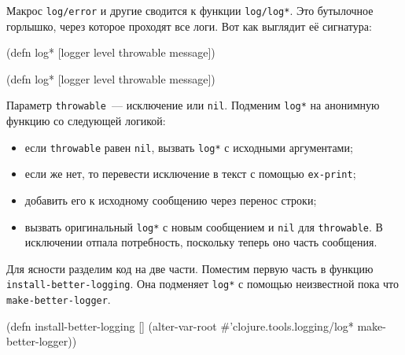 
Макрос \verb|log/error| и другие сводится к функции \verb|log/log*|. Это
бутылочное горлышко, через которое проходят все логи. Вот как выглядит её
сигнатура:

\ifnarrow

\begin{english}
  \begin{clojure}
(defn log*
  [logger level throwable message])
  \end{clojure}
\end{english}

\else

\begin{english}
  \begin{clojure}
(defn log* [logger level throwable message])
  \end{clojure}
\end{english}

\fi

Параметр \verb|throwable|~--- исключение или \verb|nil|. Подменим \verb|log*| на
анонимную функцию со следующей логикой:

\begin{itemize}

\item
  если \verb|throwable| равен \verb|nil|, вызвать \verb|log*| с исходными
  аргументами;

\item
  если же нет, то перевести исключение в текст с помощью \verb|ex-print|;

\item
  добавить его к исходному сообщению через перенос строки;

\item
  вызвать оригинальный \verb|log*| с новым сообщением и \verb|nil| для
  \verb|throwable|. В исключении отпала потребность, поскольку теперь оно
  часть сообщения.

\end{itemize}

Для ясности разделим код на две части. Поместим первую часть в функцию
\texttt{install-better-logging}. Она подменяет \verb|log*| с помощью неизвестной
пока что \texttt{make-better-logger}.

\begin{english}
  \begin{clojure}
(defn install-better-logging []
  (alter-var-root
   #'clojure.tools.logging/log*
   make-better-logger))
  \end{clojure}
\end{english}

